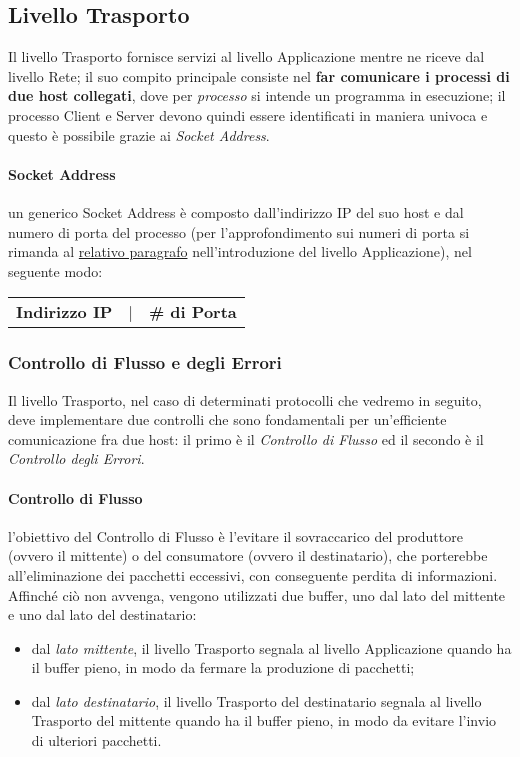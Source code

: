 \documentclass[a4paper]{article}
\begin{document}
				\newpage
	
	
		\subsection{Livello Trasporto}
		
			Il livello Trasporto fornisce servizi al livello Applicazione mentre ne riceve dal livello Rete; il suo compito principale consiste nel \textbf{far comunicare i processi di due host collegati}, dove per \emph{processo} si intende un programma in esecuzione; il processo Client e Server devono quindi essere identificati in maniera univoca e questo è possibile grazie ai \emph{Socket Address}.
			
			\paragraph{Socket Address}
				un generico Socket Address è composto dall'indirizzo IP del suo host e dal numero di porta del processo (per l'approfondimento sui numeri di porta si rimanda al \hyperref[par:porta]{relativo paragrafo} nell'introduzione del livello Applicazione), nel seguente modo:\\
				\begin{center}
					\begin{tabular}{ccc}
						\textbf{Indirizzo IP} & | & \textbf{\# di Porta}
					\end{tabular}
				\end{center}
				
			
			\subsubsection{Controllo di Flusso e degli Errori}
			
				Il livello Trasporto, nel caso di determinati protocolli che vedremo in seguito, deve implementare due controlli che sono fondamentali per un'efficiente comunicazione fra due host: il primo è il \emph{Controllo di Flusso} ed il secondo è il \emph{Controllo degli Errori}.
				
				\paragraph{Controllo di Flusso}
					l'obiettivo del Controllo di Flusso è l'evitare il sovraccarico del produttore (ovvero il mittente) o del consumatore (ovvero il destinatario), che porterebbe all'eliminazione dei pacchetti eccessivi, con conseguente perdita di informazioni. Affinché ciò non avvenga, vengono utilizzati due buffer, uno dal lato del mittente e uno dal lato del destinatario:
					\begin{itemize}
						\item dal \emph{lato mittente}, il livello Trasporto segnala al livello Applicazione quando ha il buffer pieno, in modo da fermare la produzione di pacchetti;
						\item dal \emph{lato destinatario}, il livello Trasporto del destinatario segnala al livello Trasporto del mittente quando ha il buffer pieno, in modo da evitare l'invio di ulteriori pacchetti. 
					\end{itemize}
					
\end{document}
